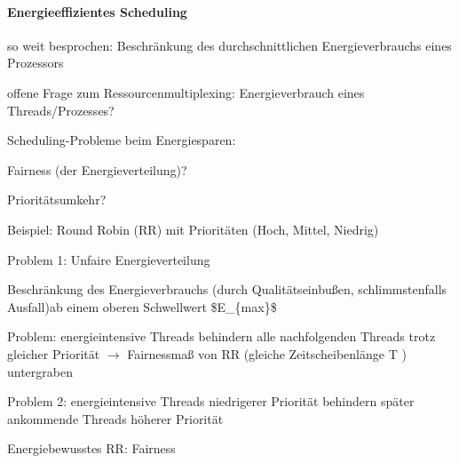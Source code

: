 \documentclass[a4paper]{article}
\begin{document}
\begin{multicols}{3}
    \paragraph{Energieeffizientes Scheduling}
    \begin{itemize*}
        \item so weit besprochen: Beschränkung des durchschnittlichen Energieverbrauchs eines Prozessors
        \item offene Frage zum Ressourcenmultiplexing: Energieverbrauch eines Threads/Prozesses?
        \item Scheduling-Probleme beim Energiesparen:
        \begin{enumerate*}
            \item Fairness (der Energieverteilung)?
            \item Prioritätsumkehr?
        \end{enumerate*}
        \item Beispiel: Round Robin (RR) mit Prioritäten (Hoch, Mittel, Niedrig)
        \item Problem 1: Unfaire Energieverteilung
        \begin{itemize*}
            \item Beschränkung des Energieverbrauchs (durch Qualitätseinbußen, schlimmstenfalls Ausfall)ab einem oberen Schwellwert \$E\_\{max\}\$
            \item Problem: energieintensive Threads behindern alle nachfolgenden Threads trotz gleicher Priorität $\rightarrow$  Fairnessmaß von RR (gleiche Zeitscheibenlänge T ) untergraben
            \item %
            \item Problem 2: energieintensive Threads niedrigerer Priorität behindern
            später ankommende Threads höherer Priorität
        \end{itemize*}
    \end{itemize*}

    Energiebewusstes RR: Fairness


\end{multicols}
\end{document}

